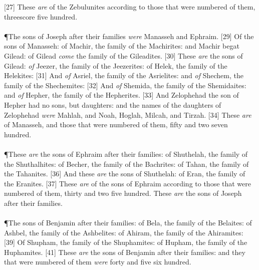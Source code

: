 [27] \textcolor[cmyk]{0.99998,1,0,0}{These \emph{are}  of the Zebulunites according to those that were numbered of them, threescore  five hundred.}\\
\\
\P \textcolor[cmyk]{0.99998,1,0,0}{The sons of Joseph after their families \emph{were} Manasseh and Ephraim.}
[29] \textcolor[cmyk]{0.99998,1,0,0}{Of the sons of Manasseh: of Machir, the family of the Machirites: and Machir begat Gilead: of Gilead \emph{come} the family of the Gileadites.}
[30] \textcolor[cmyk]{0.99998,1,0,0}{These \emph{are} the sons of Gilead: \emph{of} Jeezer, the family of the Jeezerites: of Helek, the family of the Helekites:}
[31] \textcolor[cmyk]{0.99998,1,0,0}{And \emph{of} Asriel, the family of the Asrielites: and \emph{of} Shechem, the family of the Shechemites:}
[32] \textcolor[cmyk]{0.99998,1,0,0}{And \emph{of} Shemida, the family of the Shemidaites: and \emph{of} Hepher, the family of the Hepherites.}
[33] \textcolor[cmyk]{0.99998,1,0,0}{And Zelophehad the son of Hepher had no sons, but daughters: and the names of the daughters of Zelophehad \emph{were} Mahlah, and Noah, Hoglah, Milcah, and Tirzah.}
[34] \textcolor[cmyk]{0.99998,1,0,0}{These \emph{are}  of Manasseh, and those that were numbered of them, fifty and two  seven hundred.}\\
\\
\P \textcolor[cmyk]{0.99998,1,0,0}{These \emph{are} the sons of Ephraim after their families: of Shuthelah, the family of the Shuthalhites: of Becher, the family of the Bachrites: of Tahan, the family of the Tahanites.}
[36] \textcolor[cmyk]{0.99998,1,0,0}{And these \emph{are} the sons of Shuthelah: of Eran, the family of the Eranites.}
[37] \textcolor[cmyk]{0.99998,1,0,0}{These \emph{are}  of the sons of Ephraim according to those that were numbered of them, thirty and two  five hundred. These \emph{are} the sons of Joseph after their families.}\\
\\
\P \textcolor[cmyk]{0.99998,1,0,0}{The sons of Benjamin after their families: of Bela, the family of the Belaites: of Ashbel, the family of the Ashbelites: of Ahiram, the family of the Ahiramites:}
[39] \textcolor[cmyk]{0.99998,1,0,0}{Of Shupham, the family of the Shuphamites: of Hupham, the family of the Huphamites.}
[41] \textcolor[cmyk]{0.99998,1,0,0}{These \emph{are} the sons of Benjamin after their families: and they that were numbered of them \emph{were} forty and five  six hundred.}\\
